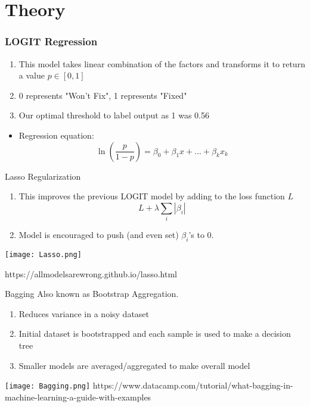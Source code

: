 \documentclass[notes,compress,serif,professionalfont]{beamer}
\begin{document}
\section{Theory}

\begin{frame}
\frametitle{LOGIT Regression}
  \begin{enumerate}[<+->]
  \item This model takes linear combination of the factors and transforms it to return a value $p \in [0, 1]$
  \item 0 represents "Won't Fix", 1 represents "Fixed"
  \item Our optimal threshold to label output as 1 was 0.56
  \end{enumerate}
  \vspace{1em}
  \begin{itemize}
  \item Regression equation:
$$ \ln{\left(\frac{p}{1-p}\right)}=\beta_0 + \beta_1 x + ... + \beta_k x_k $$
  \end{itemize}
\end{frame}

\begin{frame}{Lasso Regularization}
    \begin{enumerate}[<+->]
    \item This improves the previous LOGIT model by adding to the loss function $L$ 
    $$L + \lambda \sum_i |\beta_i|$$
    \item Model is encouraged to push (and even set) $\beta_i$'s to 0.
    \end{enumerate}
    \centering
    \texttt{[image: Lasso.png]}
    
    \tiny{https://allmodelsarewrong.github.io/lasso.html}
\end{frame}

\begin{frame}{Bagging}
    Also known as Bootstrap Aggregation.
    \vspace{1em}
    \begin{enumerate}[<+->]
    \item Reduces variance in a noisy dataset
    \item Initial dataset is bootstrapped and each sample is used to make a decision tree
    \item Smaller models are averaged/aggregated to make overall model
    \end{enumerate}
        \centering
    \texttt{[image: Bagging.png]}
    \tiny{https://www.datacamp.com/tutorial/what-bagging-in-machine-learning-a-guide-with-examples}
    
\end{frame}
\end{document}
